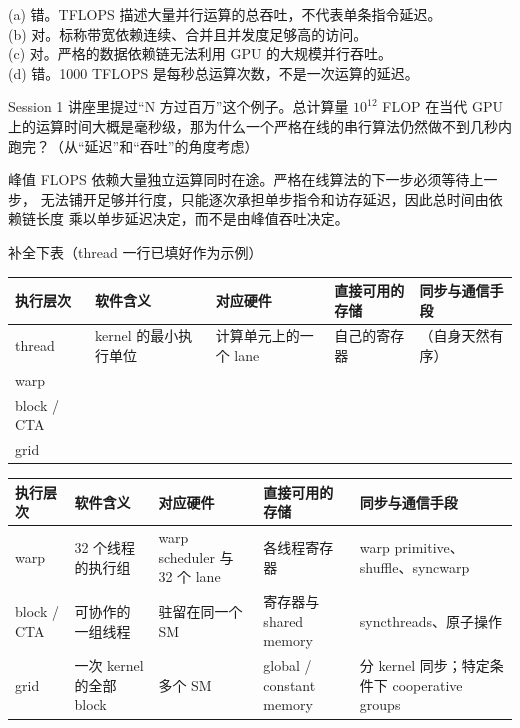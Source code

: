 \documentclass[11pt,a4paper,fontset=fandol]{ctexart}
\begin{document}
\begin{answer}
(a) 错。TFLOPS 描述大量并行运算的总吞吐，不代表单条指令延迟。\\
(b) 对。标称带宽依赖连续、合并且并发度足够高的访问。\\
(c) 对。严格的数据依赖链无法利用 GPU 的大规模并行吞吐。\\
(d) 错。1000 TFLOPS 是每秒总运算次数，不是一次运算的延迟。
\end{answer}

Session 1 讲座里提过“N 方过百万”这个例子。总计算量 $10^{12}$ FLOP 在当代 GPU 上的运算时间大概是毫秒级，那为什么一个严格在线的串行算法仍然做不到几秒内跑完？（从“延迟”和“吞吐”的角度考虑）

\begin{answer}
峰值 FLOPS 依赖大量独立运算同时在途。严格在线算法的下一步必须等待上一步，
无法铺开足够并行度，只能逐次承担单步指令和访存延迟，因此总时间由依赖链长度
乘以单步延迟决定，而不是由峰值吞吐决定。
\end{answer}

补全下表（thread 一行已填好作为示例）

\begin{center}\small
\begin{tabular}{@{}p{5.2em}p{9em}p{7.5em}p{7.5em}p{8em}@{}}
\toprule
执行层次 & 软件含义 & 对应硬件 & 直接可用的存储 & 同步与通信手段 \\
\midrule
thread & kernel 的最小执行单位 & 计算单元上的一个 lane & 自己的寄存器 & （自身天然有序） \\
warp &  &  &  &  \\
block / CTA &  &  &  &  \\
grid &  &  &  &  \\
\bottomrule
\end{tabular}
\end{center}

\begin{answer}
\begin{center}\small
\begin{tabular}{@{}p{5.2em}p{9em}p{7.5em}p{7.5em}p{8em}@{}}
\toprule
执行层次 & 软件含义 & 对应硬件 & 直接可用的存储 & 同步与通信手段 \\
\midrule
warp & 32 个线程的执行组 & warp scheduler 与 32 个 lane & 各线程寄存器 & warp primitive、shuffle、syncwarp \\
block / CTA & 可协作的一组线程 & 驻留在同一个 SM & 寄存器与 shared memory & syncthreads、原子操作 \\
grid & 一次 kernel 的全部 block & 多个 SM & global / constant memory & 分 kernel 同步；特定条件下 cooperative groups \\
\bottomrule
\end{tabular}
\end{center}
\end{answer}
\end{document}
